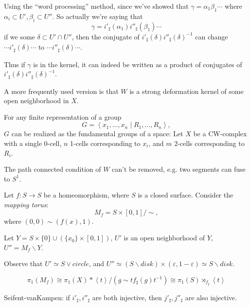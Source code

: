 Using the ``word processing'' method,
since we've showed that $\gamma = \alpha_1\beta_1\cdots$ where
$\alpha_i \subset U', \beta_i \subset U''$.
So actually we're saying that
\[
\gamma = i'_\sharp (\alpha_1) i''_\sharp(\beta_1)\cdots
\]
if we some $\delta \subset U' \cap U''$,
then the conjugate of $i'_\sharp(\delta) i''_\sharp(\delta)^{-1}$ can
change $\cdots i'_\sharp(\delta) \cdots$ to $\cdots i''_\sharp(\delta) \cdots$.

Thus if $\gamma$ is in the kernel, it can indeed be written as a product
of conjugates of $i'_\sharp(\delta) i''_\sharp(\delta)^{-1}$.

\begin{remark}
    A more frequently used version is that $W$ is a strong deformation kernel
	of some open neighborhood in $X$.
\end{remark}

\begin{example}
    For any finite representation of a group
	\[
	G = \left<x_1,\dots,x_n \mid R_1,\dots, R_n \right>,
	\]
	$G$ can be realized as the fundamental groups of a space:
	Let $X$ be a CW-complex with a single 0-cell,
	$n$ 1-cells corresponding to $x_i$, and $m$ 2-cells corresponding to $R_i$.
\end{example}

\begin{remark}
    The path connected condition of $W$ can't be removed,
	e.g. two segments can fuse to $S^1$.
\end{remark}

\begin{example}
    Let $f: S\to S$ be a homeomorphism, where $S$ is a closed surface.
	Consider the \textit{mapping torus}:
	\[
		M_f = S \times [0, 1] / \sim,
	\]
	where $(0, 0)\sim (f(x), 1)$.

	Let $Y = S \times \{0\} \cup (\{x_0\} \times  [0, 1])$, $U'$ is an open
	neighborhood of $Y$, $U'' = M_f \backslash Y$.

	Observe that $U' \simeq S \vee circle$, and $U'' \simeq (S \backslash disk)
	\times (\varepsilon, 1 - \varepsilon) \simeq S \backslash disk$.

	\[
	\pi_1(M_f) \cong \pi_1(X) * \left<t \right> / (g\sim tf_\sharp(g) t^{-1})
	\cong \pi_1(S)\rtimes_{f_\sharp} \left<t \right>
	\]
\end{example}

Seifent-vanKampen:
if $i'_\sharp, i''_\sharp$ are both injective, then $j'_\sharp, j''_\sharp$ are
also injective.

